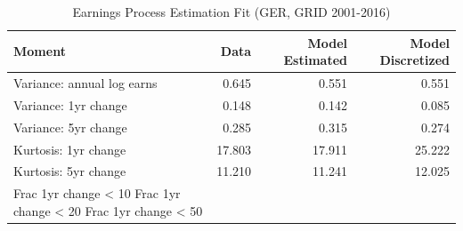 \begin{table}
\caption{Earnings Process Estimation Fit (GER, GRID 2001-2016)}
\label{tab:earnings_fit_ger}
\begin{tabular}{lrrr}
\toprule
Moment & Data & Model Estimated & Model Discretized \\
\midrule
Variance: annual log earns & 0.645 & 0.551 & 0.551 \\
Variance: 1yr change & 0.148 & 0.142 & 0.085 \\
Variance: 5yr change & 0.285 & 0.315 & 0.274 \\
Kurtosis: 1yr change & 17.803 & 17.911 & 25.222 \\
Kurtosis: 5yr change & 11.210 & 11.241 & 12.025 \\
Frac 1yr change < 10%
Frac 1yr change < 20%
Frac 1yr change < 50%
\bottomrule
\end{tabular}
\end{table}
